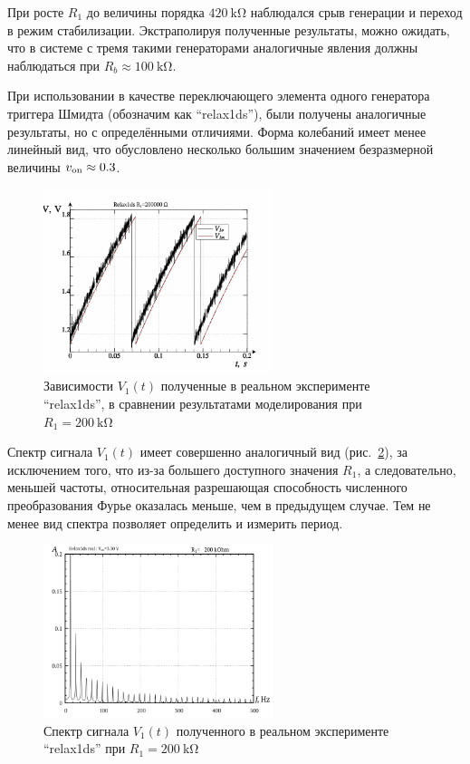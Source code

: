 При росте $R_1$ до величины порядка $\SI{420}{\kilo\ohm}$
наблюдался срыв генерации и переход в режим стабилизации.
Экстраполируя полученные результаты, можно ожидать,
что в системе с тремя такими генераторами аналогичные явления должны наблюдаться
при $R_b \approx \SI{100}{\kilo\ohm}$.

При использовании в качестве переключающего элемента одного генератора
триггера Шмидта (обозначим как ``relax1ds''), были получены аналогичные результаты,
но с определёнными отличиями. Форма колебаний
имеет менее линейный вид, что обусловлено несколько большим значением
безразмерной величины $v_\mathrm{on} \approx 0.3$.

\begin{figure}[htb!]
  \centerline{\includegraphics[width=0.6\textwidth]{p/relax1ds_read_cmp-p_t_r1=200k.png} }
  \caption{Зависимости $V_1(t)$ полученные в реальном эксперименте ``relax1ds'', в сравнении результатами моделирования при $R_1=\SI{200}{\kilo\ohm}$ }
  \label{atu:f:relax1ds_read_cmp-p_t_r1}
\end{figure}

Спектр сигнала $V_1(t)$ имеет совершенно аналогичный вид (рис.~\ref{atu:f:relax1ds_f_r1}),
за исключением того, что из-за большего доступного значения $R_1$,
а следовательно, меньшей частоты, относительная разрешающая способность
численного преобразования Фурье оказалась меньше, чем в предыдущем случае.
Тем не менее вид спектра позволяет определить и измерить период.

\begin{figure}[htb!]
  \centerline{\includegraphics[width=0.6\textwidth]{p/relax1ds_f_200000.png} }
  \caption{Спектр сигнала $V_1(t)$ полученного в реальном эксперименте ``relax1ds'' при $R_1=\SI{200}{\kilo\ohm}$}
  \label{atu:f:relax1ds_f_r1}
\end{figure}

